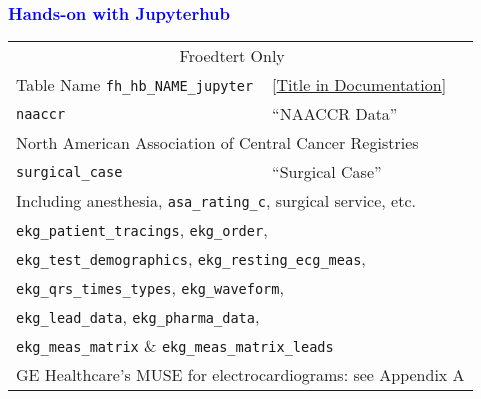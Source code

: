 \documentclass[11pt,pdftex,dvipsnames,usenames]{beamer}
\begin{document}
\begin{frame}[fragile]\frametitle{\bf\textcolor{blue}{Hands-on with Jupyterhub}}
\begin{tabular}{lll}
\multicolumn{2}{c}{Froedtert Only} \\
Table Name \texttt{fh\_hb\_NAME\_jupyter} & 
\textcolor{PineGreen}{[\href{https://ctri.mcw.edu/wp-content/uploads/CTSI-Honest-Broker-Data-Dictionary.pdf}{Title in Documentation}]} \\ \hline
\texttt{naaccr}       & ``NAACCR Data'' \\ 
\multicolumn{3}{l}{North American Association of Central Cancer Registries} \\ \hline 
\texttt{surgical\_case}       & ``Surgical Case'' \\ 
\multicolumn{3}{l}{Including anesthesia, \texttt{asa\_rating\_c}, surgical service, etc.} \\ \hline
\multicolumn{2}{l}{\texttt{ekg\_patient\_tracings}, \texttt{ekg\_order},} \\
\multicolumn{2}{l}{\texttt{ekg\_test\_demographics}, \texttt{ekg\_resting\_ecg\_meas},} \\
\multicolumn{2}{l}{\texttt{ekg\_qrs\_times\_types}, \texttt{ekg\_waveform},} \\
\multicolumn{2}{l}{\texttt{ekg\_lead\_data}, \texttt{ekg\_pharma\_data},} \\
\multicolumn{2}{l}{\texttt{ekg\_meas\_matrix} \& \texttt{ekg\_meas\_matrix\_leads}} \\
\multicolumn{3}{l}{GE Healthcare's MUSE for electrocardiograms: see Appendix A} \\ \hline
\end{tabular}

\end{frame}
\end{document}
